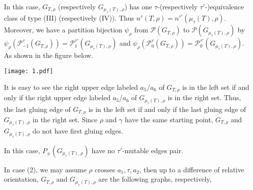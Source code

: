 \documentclass[10pt]{amsart}
\theoremstyle{theorems}
\begin{document}
In this case, $G_{T,\rho}$ (respectively $G_{\mu_{\tau}(T),\rho}$) has one $\tau$-(respectively $\tau'$-)equivalence class of type (III) (respectively (IV)). Thus $n^{\tau}(T,\rho)=n^{\tau'}(\mu_{\tau}(T),\rho)$. Moreover, we have a partition bijection $\psi_{\rho}$ from $\mathcal P(G_{T,\rho})$ to $\mathcal P(G_{\mu_{\tau}(T),\rho})$ by $\psi_{\rho}(\mathcal P^{\tau}_{-1}(G_{T,\rho}))=\mathcal P^{\tau'}_{1}(G_{\mu_{\tau}(T),\rho})$ and $\psi_{\rho}(\mathcal P^{\tau}_{0}(G_{T,\rho}))=\mathcal P^{\tau'}_{0}(G_{\mu_{\tau}(T),\rho})$. As shown in the figure below.

\centerline{\texttt{[image: 1.pdf]}}

It is easy to see the right upper edge labeled $a_5$/$a_6$ of $G_{T,\rho}$ is in the left set if and only if the right upper edge labeled $a_5$/$a_6$ of $G_{\mu_{\tau}(T),\rho}$ is in the right set. Thus, the last gluing edge of $G_{T,\rho}$ is in the left set if and only if the last gluing edge of $G_{\mu_{\tau}(T),\rho}$ in the right set. Since $\rho$ and $\gamma$ have the same starting point, $G_{T,\rho}$ and $G_{\mu_{\tau}(T),\rho}$ do not have first gluing edges.

\medskip

In this case, $P_{\pm}(G_{\mu_{\tau}(T),\rho})$ have no $\tau'$-mutable edges pair.

\medskip

In case (2), we may assume $\rho$ crosses $a_1, \tau, a_2$, then up to a difference of relative orientation, $G_{T,\rho}$ and $G_{\mu_{\tau}(T),\rho}$ are the following graphs, respectively,
\end{document}
